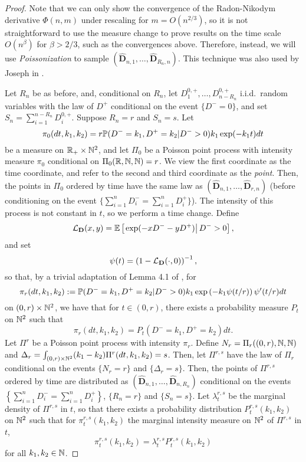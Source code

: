 \begin{proof}
Note that we can only show the convergence of the Radon-Nikodym derivative $\Phi(n,m)$ under rescaling for $m=O(n^{2/3})$, so it is not straightforward to use the measure change to prove results on the time scale $O(n^\beta)$ for $\beta>2/3$, such as the convergences above. Therefore, instead, we will use \emph{Poissonization} to sample $(\mathbf{\hat{D}}_{n,1},\dots,\mathbf{\hat{D}}_{R_n,n})$. This technique was also used by Joseph in \cite{josephComponentSizesCritical2014}. 

 Let $R_n$ be as before, and, conditional on $R_n$, let $D^{0,+}_1,\dots,D^{0,+}_{n-R_n}$ i.i.d.\ random variables with the law of $D^+$ conditional on the event $\{D^-=0\}$, and set $S_n=\sum_{i=1}^{n-R_n}D^{0,+}_i$. Suppose $R_n=r$ and $S_n=s$. 
Let
$$\pi_0(dt,k_1,k_2)=r\P(D^-=k_1,D^+=k_2|D^->0)k_1\exp(-k_1 t)dt$$
be a measure on $\R_+\times \N^2$, and let $\Pi_0$ be a Poisson point process with intensity measure $\pi_0$ conditional on $\Pi_0(\R,\N,\N)=r$. We view the first coordinate as the time coordinate, and refer to the second and third coordinate as the \emph{point}. Then, the points in $\Pi_0$ ordered by time have the same law as $(\mathbf{\hat{D}}_{n,1},\dots,\mathbf{\hat{D}}_{r,n})$ (before conditioning on the event $\{\sum_{i=1}^nD^-_i=\sum_{i=1}^nD^+_i\}$).  
The intensity of this process is not constant in $t$, so we perform a time change. Define
$$\cL_{\mathbf{D}}(x,y)=\E\left[\left.\exp(-xD^--yD^+)\right|D^->0 \right],$$
and set 
$$\psi(t)=\left(1-\cL_{\mathbf{D}}(\cdot,0)\right)^{-1},$$
so that, by a trivial adaptation of Lemma 4.1 of \cite{josephComponentSizesCritical2014}, for 
$$\pi_r(dt,k_1,k_2):=\P(D^-=k_1,D^+=k_2|D^->0)k_1\exp\left(-k_1 \psi(t/r)\right)\psi'(t/r)dt$$
on $(0,r)\times \N^2$, we have that for $t\in (0,r)$, there exists a probability measure $P_t$ on $\N^2$ such that
$$\pi_r(dt,k_1,k_2)=P_t(D^-=k_1,D^+=k_2)dt.$$
Let ${\Pi}^r$ be a Poisson point process with intensity $\pi_r$. Define $N_r= {\Pi}_r((0,r),\N,\N)$ and $\Delta_r=\int_{(0,r)\times \N^2}(k_1-k_2){\Pi}^r(dt,k_1,k_2)=s$. Then, let ${\Pi}^{r,s}$ have the law of ${\Pi}_r$ conditional on the events $\{N_r=r\}$ and $\{\Delta_r=s\}$. Then, the points of ${\Pi}^{r,s}$ ordered by time are distributed as $(\mathbf{\hat{D}}_{n,1},\dots,\mathbf{\hat{D}}_{n,R_n})$ conditional on the events $\left\{\sum_{i=1}^nD^-_i=\sum_{i=1}^nD^+_i\right\}$, $\{R_n=r\}$ and $\{S_n=s\}$. Let ${\lambda}^{r,s}_t$ be the marginal density of ${\Pi}^{r,s}$ in $t$, so that there exists a probability distribution ${P}^{r,s}_t(k_1,k_2)$ on $\N^2$ such that for ${\pi}^{r,s}_t(k_1,k_2)$ the marginal intensity measure on $\N^2$ of ${\Pi}^{r,s}$ in $t$, 
$${\pi}^{r,s}_t(k_1,k_2)={\lambda}^{r,s}_t{P}^{r,s}_t(k_1,k_2)$$
for all $k_1,k_2\in \N$.


\end{proof}
